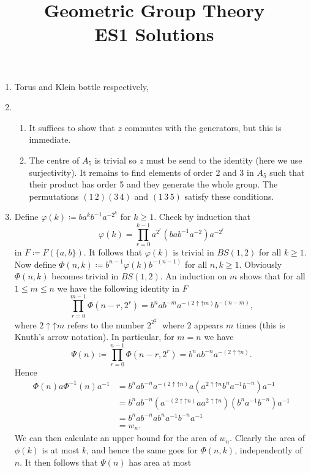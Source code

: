 \documentclass{article}
\newcommand\binuparrow{\mathbin{\uparrow}}
\theoremstyle{definition}
\theoremstyle{plain}
\theoremstyle{definition}
\begin{document}
	\title{Geometric Group Theory\\ ES1 Solutions}
	\date{}
	\maketitle
	\begin{enumerate}
		\item Torus and Klein bottle respectively,
		\item \begin{enumerate}
			\item It suffices to show that $z$ commutes with the generators, but this is immediate.
			\item The centre of $A_5$ is trivial so $z$ must be send to the identity (here we use surjectivity). It remains to find elements of order 2 and 3 in $A_5$ such that their product has order 5 and they generate the whole group. The permutations $(1\,2)(3\,4)$ and $(1\,3\,5)$ satisfy these conditions.
		\end{enumerate}
		\item Define $\varphi(k)\coloneqq ba^kb^{-1}a^{-2^k}$ for $k\geq 1$. Check by induction that
		\[
			\varphi(k) =\prod_{r=0}^{k-1}a^{2^{r}}(bab^{-1}a^{-2})a^{-2^r}
		\]
		in $F\coloneqq F(\{a,b\})$. It follows that $\varphi(k)$ is trivial in $BS(1,2)$ for all $k\geq 1$. Now define $\Phi(n,k)\coloneqq b^{n-1}\varphi(k)b^{-(n-1)}$ for all $n,k\geq 1$. Obviously $\Phi(n,k)$ becomes trivial in $BS(1,2)$. An induction on $m$ shows that for all $1\leq m\leq n$ we have the following identity in $F$
		\[
			 \prod_{r=0}^{m-1} \Phi(n-r,2^r)= b^{n}ab^{-m}a^{-(2\binuparrow\binuparrow m)}b^{-(n-m)},
		\]
		where $2\binuparrow\binuparrow m$ refers to the number $2^{2^{2^{\iddots}}}$ where $2$ appears $m$ times (this is Knuth's arrow notation). In particular, for $m=n$ we have
		\[
			\Psi(n)\coloneqq \prod_{r=0}^{n-1} \Phi(n-r,2^r)= b^nab^{-n}a^{-(2\binuparrow\binuparrow n)} .
		\]
		Hence
		\begin{align*}
			\Phi(n)a\Phi^{-1}(n)a^{-1} &= b^nab^{-n}a^{-(2\binuparrow\binuparrow n)} a(a^{2\binuparrow\binuparrow n}b^na^{-1}b^{-n})a^{-1}\\
			&= b^nab^{-n}(a^{-(2\binuparrow\binuparrow n)} aa^{2\binuparrow\binuparrow n})(b^na^{-1}b^{-n})a^{-1}\\
			&= b^nab^{-n}ab^na^{-1}b^{-n}a^{-1}\\
			&= w_n.
		\end{align*}
		We can then calculate an upper bound for the area of $w_n$. Clearly the area of $\phi(k)$ is at most $k$, and hence the same goes for $\Phi(n,k)$, independently of $n$. It then follows that $\Psi(n)$ has area at most 

\end{enumerate}
\end{document}
